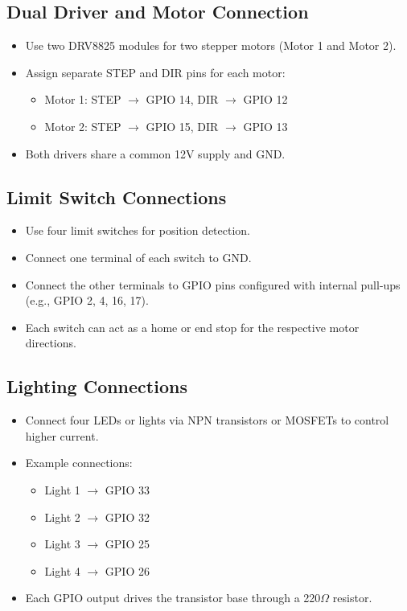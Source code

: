 \documentclass[../weekly]{subfiles}
\begin{document}
\subsection{Dual Driver and Motor Connection}
\begin{itemize}
    \item Use two DRV8825 modules for two stepper motors (Motor 1 and Motor 2).
    \item Assign separate STEP and DIR pins for each motor:
    \begin{itemize}
        \item Motor 1: STEP $\rightarrow$ GPIO 14, DIR $\rightarrow$ GPIO 12
        \item Motor 2: STEP $\rightarrow$ GPIO 15, DIR $\rightarrow$ GPIO 13
    \end{itemize}
    \item Both drivers share a common 12V supply and GND.
\end{itemize}

\subsection{Limit Switch Connections}
\begin{itemize}
    \item Use four limit switches for position detection.
    \item Connect one terminal of each switch to GND.
    \item Connect the other terminals to GPIO pins configured with internal pull-ups (e.g., GPIO 2, 4, 16, 17).
    \item Each switch can act as a home or end stop for the respective motor directions.
\end{itemize}

\subsection{Lighting Connections}
\begin{itemize}
    \item Connect four LEDs or lights via NPN transistors or MOSFETs to control higher current.
    \item Example connections:
    \begin{itemize}
        \item Light 1 $\rightarrow$ GPIO 33
        \item Light 2 $\rightarrow$ GPIO 32
        \item Light 3 $\rightarrow$ GPIO 25
        \item Light 4 $\rightarrow$ GPIO 26
    \end{itemize}
    \item Each GPIO output drives the transistor base through a 220$\Omega$ resistor.
\end{itemize}
\end{document}
